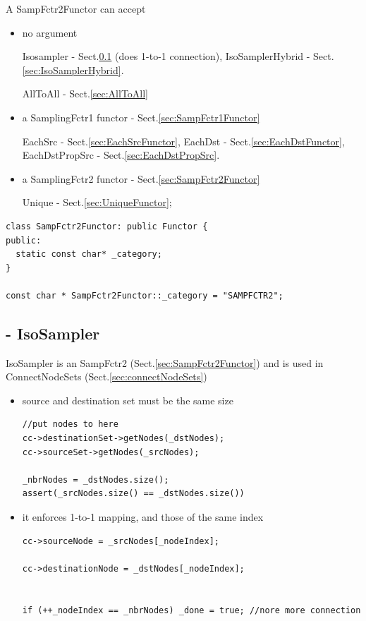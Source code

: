 A SampFctr2Functor can accept
\begin{itemize}
  \item no argument
  
  Isosampler - Sect.\ref{sec:IsoSampler} (does 1-to-1 connection),
  IsoSamplerHybrid - Sect.\ref{sec:IsoSamplerHybrid}.
  
  AllToAll - Sect.\ref{sec:AllToAll}
  
  \item a SamplingFctr1 functor - Sect.\ref{sec:SampFctr1Functor}
  
  EachSrc - Sect.\ref{sec:EachSrcFunctor}, EachDst -
  Sect.\ref{sec:EachDstFunctor}, EachDstPropSrc - Sect.\ref{sec:EachDstPropSrc}.
  
  \item a SamplingFctr2 functor - Sect.\ref{sec:SampFctr2Functor}
  
  Unique - Sect.\ref{sec:UniqueFunctor};
\end{itemize}





\begin{verbatim}
class SampFctr2Functor: public Functor {
public:
  static const char* _category;
}

const char * SampFctr2Functor::_category = "SAMPFCTR2";
\end{verbatim}

\subsection{- IsoSampler}
\label{sec:IsoSampler}

IsoSampler is an SampFctr2 (Sect.\ref{sec:SampFctr2Functor}) and is used in
ConnectNodeSets (Sect.\ref{sec:connectNodeSets})
\begin{itemize}
  \item source and destination set must be the same size
  
\begin{verbatim}
//put nodes to here
cc->destinationSet->getNodes(_dstNodes);
cc->sourceSet->getNodes(_srcNodes);

_nbrNodes = _dstNodes.size();
assert(_srcNodes.size() == _dstNodes.size())
\end{verbatim}
  
  \item it enforces 1-to-1 mapping, and those of the same index
\begin{verbatim}
cc->sourceNode = _srcNodes[_nodeIndex];

cc->destinationNode = _dstNodes[_nodeIndex];


if (++_nodeIndex == _nbrNodes) _done = true; //nore more connection
\end{verbatim}
\end{itemize}


